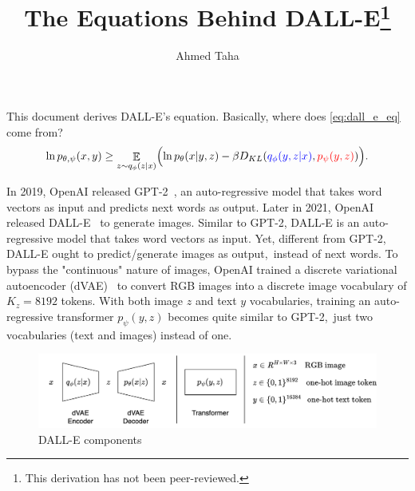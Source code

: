\documentclass{article}
\DeclareMathOperator{\EX}{\mathbb{E}}%
\begin{document}
	


	
	\title{The Equations Behind DALL-E\footnote{This derivation has not been peer-reviewed.}} %
	\author{Ahmed Taha} %
	\date{}
	\maketitle
	
	This document derives DALL-E's equation. Basically, where does \autoref{eq:dall_e_eq} come from?
	\begin{equation}\label{eq:dall_e_eq}
		\ln p_{\theta,\psi}(x,y) \ge \mathop{\EX}_{z\sim q_\phi(z|x)}
		\Bigl(\ln p_\theta(x|y,z) -\beta D_{KL}(\textcolor{blue}{q_\phi(y,z|x)}, \textcolor{red}{p_\psi(y,z)})\Bigr).
	\end{equation}

	In 2019, OpenAI released GPT-2~\cite{radford2019language}, an auto-regressive model that takes word vectors as input and predicts next words as output. Later in 2021, OpenAI released DALL-E~\cite{ramesh2021zero} to generate images. Similar to GPT-2, DALL-E is an auto-regressive model that takes word vectors as input. Yet, different from GPT-2, DALL-E ought to predict/generate images as output,~\ie instead of next words. To bypass the "continuous" nature of images, OpenAI trained a discrete variational autoencoder (dVAE)~\cite{van2017neural,razavi2019generating} to convert RGB images into a discrete image vocabulary of $K_z=8192$ tokens. With both image $z$ and text $y$ vocabularies, training an auto-regressive transformer $p_{\psi}(y,z)$ becomes quite similar to GPT-2,~\ie just two vocabularies (text and images) instead of one.\\
	
		\begin{figure}[h]
		\centering
		\includegraphics[width=0.9\linewidth]{dalle_components}
		\caption{DALL-E components}
		\label{fig:dallecomponents}
	\end{figure}
\end{document}
